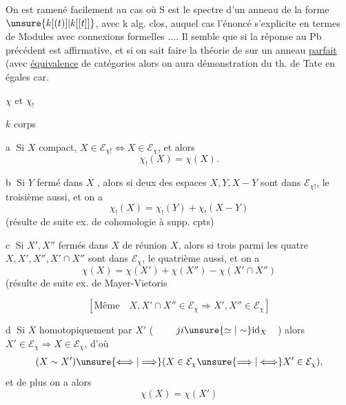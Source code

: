 On est ramené facilement au cas où S est le spectre d'un anneau de la forme $\unsure{k[(t)]|k[[t]]}$, avec k alg. clos, auquel cas l'énoncé s'explicite en termes de Modules avec connexions formelles .... Il semble que si la réponse au Pb précédent est affirmative,  et si on sait faire la théorie de  sur un anneau \uline{parfait} (avec \uline{équivalence} de catégories alors on aura démonstration du th. de Tate en égales car.


$\chi$ et $\chi_!$


$k$ corps


\textcircled{a}  Si $X$ compact, $X\in\mathcal{E}_{\chi!}\Longleftrightarrow X\in\mathcal{E}_{\chi}$, et alors
\[
\chi_!(X)=\chi(X).
\]

\textcircled{b} Si $Y$ fermé dans $X$ , alors si deux des espaces $X,Y,X-Y$ sont dans $\mathcal{E}_{\chi!}$, le troisième aussi, et on a
\[
\chi_!(X)=\chi_!(Y)+\chi_!(X-Y)
\]
(résulte de suite ex. de cohomologie à supp. cpts)

\textcircled{c} Si $X',X''$ fermés dans $X$ de réunion $X$, alors si trois parmi les quatre  $X,X',X'',X'\cap X''$ sont dans $\mathcal{E}_{\chi}$, le quatrième aussi, et on a
\[
\chi(X)=\chi(X')+\chi(X'')-\chi(X'\cap X'')
\]
(résulte de suite ex. de Mayer-Vietoris

\[
[\text{Même}\quad X,X'\cap X''\in\mathcal{E}_{\chi}\Longrightarrow X',X''\in\mathcal{E}_{\chi}]
\]

\textcircled{d} Si $X$   homotopiquement par $X'$
(
$\qquad ji\unsure{\simeq|\sim}\mathrm{id}_X\quad$) alors $X'\in\mathcal{E}_{\chi}\Longrightarrow X\in\mathcal{E}_{\chi}$, d'où
\[
(X\sim X')\unsure{\Longleftrightarrow|\Longrightarrow}(X\in\mathcal{E}_{\chi}\unsure{\Longrightarrow|\Longleftrightarrow}X'\in\mathcal{E}_{\chi}),
\]
et de plus on a alors
\[
\chi(X)=\chi(X')
\]

